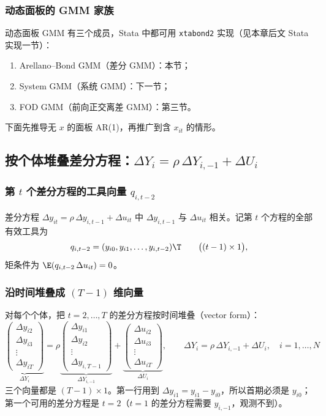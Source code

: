 \subsubsection{动态面板的 GMM 家族}

动态面板 GMM 有三个成员，Stata 中都可用 \texttt{xtabond2} 实现（见本章后文 Stata 实现一节）：
\begin{enumerate}
  \item Arellano--Bond GMM（差分 GMM）：本节；
  \item System GMM（系统 GMM）：下一节；
  \item FOD GMM（前向正交离差 GMM）：第三节。
\end{enumerate}
下面先推导无 $x$ 的面板 AR(1)，再推广到含 $x_{it}$ 的情形。

\subsection{按个体堆叠差分方程：\texorpdfstring{$\Delta Y_i=\rho\,\Delta Y_{i,-1}+\Delta U_i$}{Delta Y = rho Delta Y(-1) + Delta U}}

\subsubsection{第 \texorpdfstring{$t$}{t} 个差分方程的工具向量 \texorpdfstring{$q_{i,t-2}$}{q(i,t-2)}}

差分方程 $\Delta y_{it}=\rho\,\Delta y_{i,t-1}+\Delta u_{it}$ 中 $\Delta y_{i,t-1}$ 与 $\Delta u_{it}$ 相关。记第 $t$ 个方程的全部有效工具为
\[
q_{i,t-2}=(y_{i0},y_{i1},\dots,y_{i,t-2})\T\qquad\big((t-1)\times1\big),
\]
矩条件为 $\E(q_{i,t-2}\,\Delta u_{it})=0$。

\subsubsection{沿时间堆叠成 \texorpdfstring{$(T-1)$}{(T-1)} 维向量}

对每个个体，把 $t=2,\dots,T$ 的差分方程按时间堆叠（vector form）：
\[
\underbrace{\begin{pmatrix}\Delta y_{i2}\\ \Delta y_{i3}\\ \vdots\\ \Delta y_{iT}\end{pmatrix}}_{\Delta Y_i}
=\rho\underbrace{\begin{pmatrix}\Delta y_{i1}\\ \Delta y_{i2}\\ \vdots\\ \Delta y_{i,T-1}\end{pmatrix}}_{\Delta Y_{i,-1}}
+\underbrace{\begin{pmatrix}\Delta u_{i2}\\ \Delta u_{i3}\\ \vdots\\ \Delta u_{iT}\end{pmatrix}}_{\Delta U_i},
\qquad
\boxed{\Delta Y_i=\rho\,\Delta Y_{i,-1}+\Delta U_i,\quad i=1,\dots,N}
\]
三个向量都是 $(T-1)\times1$。第一行用到 $\Delta y_{i1}=y_{i1}-y_{i0}$，所以首期必须是 $y_{i0}$；第一个可用的差分方程是 $t=2$（$t=1$ 的差分方程需要 $y_{i,-1}$，观测不到）。

